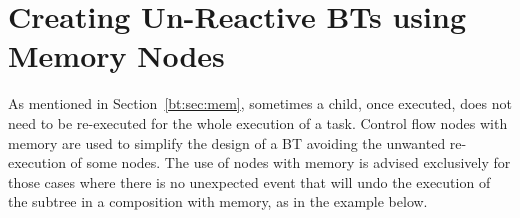 %
%
%
%
%
%

\section{Creating Un-Reactive BTs using Memory Nodes}
\label{sec:design:memory}
As mentioned in Section~\ref{bt:sec:mem}, sometimes a child, once executed, does not need to be re-executed for the whole execution of a task. 
Control flow nodes with memory	are used to simplify the design of a BT avoiding the unwanted re-execution of some nodes. The use of nodes with memory is advised exclusively for those cases where there is no unexpected event that will undo the execution of the subtree in a composition with memory, as in the 
example below.

